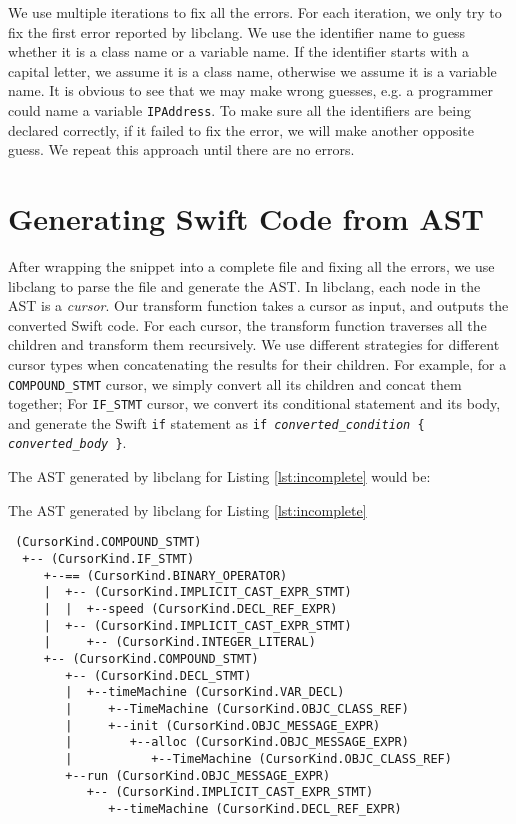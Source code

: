 \documentclass{sfuthesis}
\begin{document}
We use multiple iterations to fix all the errors. For each iteration, we only try to fix the first error reported by libclang. We use the identifier name to guess whether it is a class name or a variable name. If the identifier starts with a capital letter, we assume it is a class name, otherwise we assume it is a variable name. It is obvious to see that we may make wrong guesses, e.g. a programmer could name a variable \texttt{IPAddress}. To make sure all the identifiers are being declared correctly, if it failed to fix the error, we will make another opposite guess. We repeat this approach until there are no errors.



\section{Generating Swift Code from AST}

After wrapping the snippet into a complete file and fixing all the errors, we use libclang to parse the file and generate the AST. In libclang, each node in the AST is a \emph{cursor}. Our transform function takes a cursor as input, and outputs the converted Swift code. For each cursor, the transform function traverses all the children and transform them recursively. We use different strategies for different cursor types when concatenating the results for their children. For example, for a \texttt{COMPOUND\_STMT} cursor, we simply convert all its children and concat them together; For \texttt{IF\_STMT} cursor, we convert its conditional statement and its body, and generate the Swift \texttt{if} statement as \texttt{if \emph{converted\_condition} \{ \emph{converted\_body} \}}.

The AST generated by libclang for Listing \ref{lst:incomplete} would be:

\begin{listing}[H]
\caption{The AST generated by libclang for Listing \ref{lst:incomplete}}
\label{lst:ast}
\begin{verbatim}
 (CursorKind.COMPOUND_STMT)
  +-- (CursorKind.IF_STMT)
     +--== (CursorKind.BINARY_OPERATOR)
     |  +-- (CursorKind.IMPLICIT_CAST_EXPR_STMT)
     |  |  +--speed (CursorKind.DECL_REF_EXPR)
     |  +-- (CursorKind.IMPLICIT_CAST_EXPR_STMT)
     |     +-- (CursorKind.INTEGER_LITERAL)
     +-- (CursorKind.COMPOUND_STMT)
        +-- (CursorKind.DECL_STMT)
        |  +--timeMachine (CursorKind.VAR_DECL)
        |     +--TimeMachine (CursorKind.OBJC_CLASS_REF)
        |     +--init (CursorKind.OBJC_MESSAGE_EXPR)
        |        +--alloc (CursorKind.OBJC_MESSAGE_EXPR)
        |           +--TimeMachine (CursorKind.OBJC_CLASS_REF)
        +--run (CursorKind.OBJC_MESSAGE_EXPR)
           +-- (CursorKind.IMPLICIT_CAST_EXPR_STMT)
              +--timeMachine (CursorKind.DECL_REF_EXPR)
\end{verbatim}
\end{listing}
\end{document}
